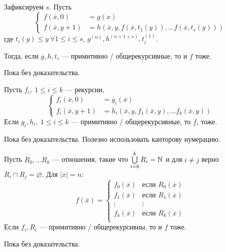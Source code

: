 \begin{thm}
    Зафиксируем $ s$. Пусть 
	\[
	\begin{cases}
		f(\overline{x}, 0) &= g(x) \\
		f(\overline{x}, y+1) &= h(\overline{x}, y, f(\overline{x}, t_1(y)), \ldots f(\overline{x}, t_{s}(y)))
	\end{cases}
	\] 
	где $ t_i(g) \le y ~ \forall 1 \le i \le s$, $ g^{(n)}, h^{(n+1+s)}, t_i^{(1)}$.

	\noindent
	Тогда, если $ g, h, t_i$ --- примитивно / общерекурсивные, то и $ f$ тоже.
\end{thm}
\begin{proof*}
    Пока без доказательства.
\end{proof*}


\begin{thm}
	Пусть $ f_i, ~ 1 \le i \le k$ --- рекурсии,
	\[
	\begin{cases}
		f_i(\overline{x}, 0) &= g_i(\overline{x}) \\
		f_i(\overline{x}, y+1) &= h_i (\overline{x}, y, f_1(\overline{x}, y), \ldots f_{k}(\overline{x}, y))
	\end{cases}
	\] 
	Если $ g_i, h_i, ~1 \le i \le k$ --- примитивно / общерекурсивные, то $ f_i$ тоже.
\end{thm}
\begin{proof*}
    Пока без доказательства. Полезно использовать канторову нумерацию.
\end{proof*}


\begin{thm}
    Пусть $ R_0, \ldots R_k $ --- отношения, такие что $ \bigcup\limits_{i=0}^{k} R_i = \mathbb{N}$ и для $ i \ne  j$ верно $ R_{i} \cap R_j = \varnothing$. Для $ \lvert \overline{x} \rvert = n$:
\[
	f(\overline{x}) = \begin{cases}
		f_0(\overline{x}) & \text{если }R_0(\overline{x}) \\
		f_1(\overline{x}) &  \text{если }R_1(\overline{x}) \\
		\vdots & \vdots \\
		f_k(\overline{x}) &  \text{если }R_k(\overline{x}) \\
	\end{cases}
\] 
Если $ f_i, R_i$ --- примитивно / общерекурсивны, то и $ f$ тоже.
\end{thm}
\begin{proof*}
    Пока без доказательства.
\end{proof*}


